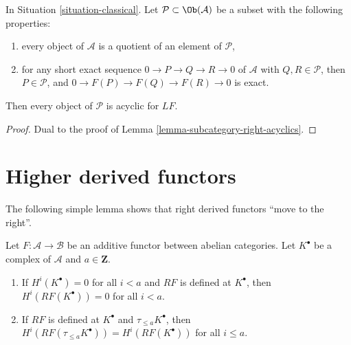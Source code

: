 \begin{lemma}
\label{lemma-subcategory-left-acyclics}
In
Situation \ref{situation-classical}.
Let $\mathcal{P} \subset \Ob(\mathcal{A})$ be a subset with the
following properties:
\begin{enumerate}
\item every object of $\mathcal{A}$ is a quotient of an element of
$\mathcal{P}$,
\item for any short exact sequence $0 \to P \to Q \to R \to 0$ of
$\mathcal{A}$ with $Q, R \in \mathcal{P}$, then $P \in \mathcal{P}$,
and $0 \to F(P) \to F(Q) \to F(R) \to 0$ is exact.
\end{enumerate}
Then every object of $\mathcal{P}$ is acyclic for $LF$.
\end{lemma}

\begin{proof}
Dual to the proof of
Lemma \ref{lemma-subcategory-right-acyclics}.
\end{proof}







\section{Higher derived functors}
\label{section-higher-derived}

\noindent
The following simple lemma shows that right derived functors
``move to the right''.

\begin{lemma}
\label{lemma-negative-vanishing}
Let $F : \mathcal{A} \to \mathcal{B}$ be an additive functor
between abelian categories. Let $K^\bullet$ be a complex of $\mathcal{A}$
and $a \in \mathbf{Z}$.
\begin{enumerate}
\item If $H^i(K^\bullet) = 0$ for all $i < a$ and $RF$ is defined at
$K^\bullet$, then $H^i(RF(K^\bullet)) = 0$ for all $i < a$.
\item If $RF$ is defined at $K^\bullet$ and $\tau_{\leq a}K^\bullet$,
then $H^i(RF(\tau_{\leq a}K^\bullet)) = H^i(RF(K^\bullet))$
for all $i \leq a$.
\end{enumerate}
\end{lemma}

